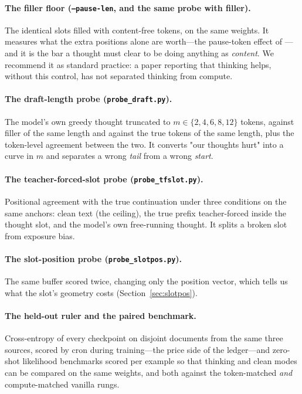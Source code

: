\documentclass{article} %
\begin{document}
\paragraph{The filler floor (\texttt{--pause-len}, and the same probe with filler).} The identical slots filled with content-free tokens, on the same weights. It measures what the extra positions alone are worth---the pause-token effect of \citet{goyal2024think}---and it is the bar a thought must clear to be doing anything as \emph{content}. We recommend it as standard practice: a paper reporting that thinking helps, without this control, has not separated thinking from compute.

\paragraph{The draft-length probe (\texttt{probe\_draft.py}).} The model's own greedy thought truncated to $m \in \{2,4,6,8,12\}$ tokens, against filler of the same length and against the true tokens of the same length, plus the token-level agreement between the two. It converts "our thoughts hurt" into a curve in $m$ and separates a wrong \emph{tail} from a wrong \emph{start}.

\paragraph{The teacher-forced-slot probe (\texttt{probe\_tfslot.py}).} Positional agreement with the true continuation under three conditions on the same anchors: clean text (the ceiling), the true prefix teacher-forced inside the thought slot, and the model's own free-running thought. It splits a broken slot from exposure bias.

\paragraph{The slot-position probe (\texttt{probe\_slotpos.py}).} The same buffer scored twice, changing only the position vector, which tells us what the slot's geometry costs (Section~\ref{sec:slotpos}).

\paragraph{The held-out ruler and the paired benchmark.} Cross-entropy of every checkpoint on disjoint documents from the same three sources, scored by cron during training---the price side of the ledger---and zero-shot likelihood benchmarks scored per example so that thinking and clean modes can be compared on the same weights, and both against the token-matched \emph{and} compute-matched vanilla rungs.
\end{document}
